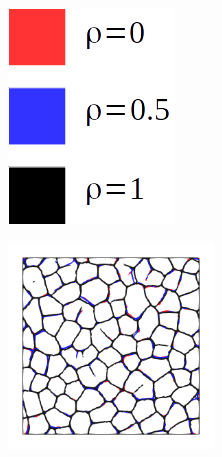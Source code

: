 \begin{figure}[!htbp]
\begin{subfigure}[b]{0.35\textwidth}
    \end{subfigure}
    \begin{subfigure}[b]{0.07\textwidth}
        \includegraphics[width=\textwidth]{colorbar/rho.png}
        \vspace{0.2in}
    \end{subfigure}
    \begin{subfigure}[b]{0.35\textwidth}
        \includegraphics[width=0.6\textwidth]{past/figures/Gc_constant.png}
    \end{subfigure}
    

\end{figure}
